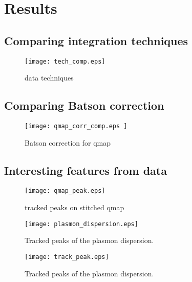\section{Results}
\subsection{Comparing integration techniques}

\begin{figure}
	\centering
	\texttt{[image: tech\_comp.eps]}
	\caption{data techniques}
	\label{fig:tech-comp}
\end{figure}



\subsection{Comparing Batson correction}

\begin{figure}
	\centering
	\texttt{[image: 
		qmap\_corr\_comp.eps
		]}
	\caption{Batson correction for qmap}
	\label{fig:bat-cor}
\end{figure}



\subsection{Interesting features from data}

\begin{figure}
	\centering
	\texttt{[image: qmap\_peak.eps]}
	\caption{tracked peaks on stitched qmap}
	\label{fig:qmap-track}
\end{figure}


\begin{figure}
	\centering
	\texttt{[image: plasmon\_dispersion.eps]}
	\caption{Tracked peaks of the plasmon dispersion.}
	\label{fig:plas_disp}
\end{figure}

\begin{figure}
	\centering
	\texttt{[image: track\_peak.eps]}
	\caption{Tracked peaks of the plasmon dispersion.}
	\label{fig:track_peak}
\end{figure}